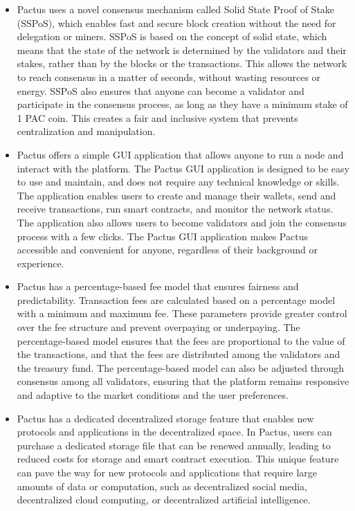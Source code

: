 \documentclass{novel}
\begin{document}
\begin{itemize}
\item Pactus uses a novel consensus mechanism called Solid State Proof of Stake (SSPoS), which enables fast and secure block creation without the need for delegation or miners. SSPoS is based on the concept of solid state, which means that the state of the network is determined by the validators and their stakes, rather than by the blocks or the transactions. This allows the network to reach consensus in a matter of seconds, without wasting resources or energy. SSPoS also ensures that anyone can become a validator and participate in the consensus process, as long as they have a minimum stake of 1 PAC coin. This creates a fair and inclusive system that prevents centralization and manipulation.
\item Pactus offers a simple GUI application that allows anyone to run a node and interact with the platform. The Pactus GUI application is designed to be easy to use and maintain, and does not require any technical knowledge or skills. The application enables users to create and manage their wallets, send and receive transactions, run smart contracts, and monitor the network status. The application also allows users to become validators and join the consensus process with a few clicks. The Pactus GUI application makes Pactus accessible and convenient for anyone, regardless of their background or experience.
\item Pactus has a percentage-based fee model that ensures fairness and predictability. Transaction fees are calculated based on a percentage model with a minimum and maximum fee. These parameters provide greater control over the fee structure and prevent overpaying or underpaying. The percentage-based model ensures that the fees are proportional to the value of the transactions, and that the fees are distributed among the validators and the treasury fund. The percentage-based model can also be adjusted through consensus among all validators, ensuring that the platform remains responsive and adaptive to the market conditions and the user preferences.
\item Pactus has a dedicated decentralized storage feature that enables new protocols and applications in the decentralized space. In Pactus, users can purchase a dedicated storage file that can be renewed annually, leading to reduced costs for storage and smart contract execution. This unique feature can pave the way for new protocols and applications that require large amounts of data or computation, such as decentralized social media, decentralized cloud computing, or decentralized artificial intelligence.
\end{itemize}
\end{document}
